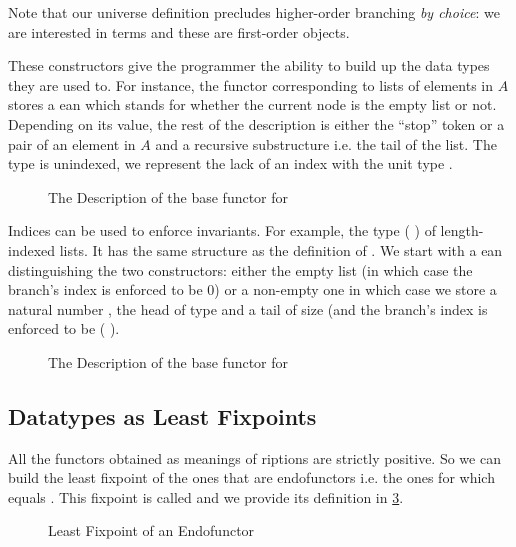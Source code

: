 Note that our universe definition precludes higher-order branching
\emph{by choice}: we are interested in terms and these are first-order
objects.

These constructors give the programmer the ability to build up the data
types they are used to. For instance, the functor corresponding
to lists of elements in $A$ stores a ean which stands for whether
the current node is the empty list or not. Depending on its value, the
rest of the description is either the ``stop'' token or a pair of an element
in $A$ and a recursive substructure i.e. the tail of the list.
The  type is unindexed, we represent the lack of an index with
the unit type \AD{$\top$}.

\begin{figure}[h]
\caption{The Description of the base functor for ~}
\label{figure:listD}
\end{figure}

Indices can be used to enforce invariants. For example, the type
({  }) of length-indexed lists. It has the
same structure as the definition of .
We start with a ean distinguishing the two constructors: either
the empty list (in which case the branch's index is enforced to be $0$) or a
non-empty one in which case we store a natural number , the head of type
 and a tail of size  (and the branch's index is enforced to be
( ).

\begin{figure}[h]
\caption{The Description of the base functor for ~~}\label{figure:vecD}
\end{figure}

\subsection{Datatypes as Least Fixpoints}

All the functors obtained as meanings of riptions are strictly
positive. So we can build the least fixpoint of the ones that are
endofunctors i.e. the ones for which  equals . This fixpoint
is called  and we provide its definition in \cref{figure:datamu}.

\begin{figure}[h]
\caption{Least Fixpoint of an Endofunctor}\label{figure:datamu}
\end{figure}

